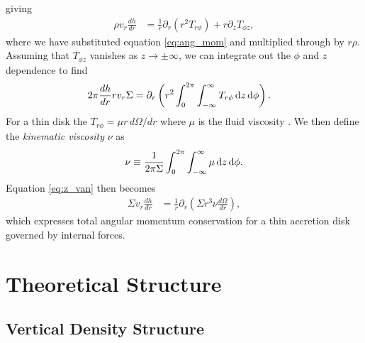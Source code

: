 giving
\begin{align}
    \rho v_r \frac{dh}{dr} &= \frac{1}{r} \partial_r (r^2 T_{r\phi}) + r \partial_z T_{\phi z},
\end{align}
where we have substituted equation \ref{eq:ang_mom} and multiplied through by $r \rho$.
Assuming that $T_{\phi z}$ vanishes as $z\rightarrow\pm\infty$, we can integrate out the $\phi$ and $z$ dependence to find
\begin{align}
    2\pi \frac{dh}{dr} r v_r \Sigma &= \partial_r \left( r^2 \int_0^{2\pi} \int_{-\infty}^\infty T_{r\phi} \mathop{}\!\mathrm{d}{z} \mathop{}\!\mathrm{d}{\phi} \right). \label{eq:z_van}
\end{align}
For a thin disk the $T_{r\phi}=\mu r \, d\Omega/dr$ where $\mu$ is the fluid viscosity \citep[see review by][]{papaloizou1995}.
We then define the \textit{kinematic viscosity} $\nu$ as
\begin{align}
    \nu \equiv \frac{1}{2 \pi \Sigma} \int_0^{2\pi} \int_{-\infty}^\infty \mu \mathop{}\!\mathrm{d}{z} \mathop{}\!\mathrm{d}{\phi}.
\end{align}
Equation \ref{eq:z_van} then becomes
\begin{align}
    \Sigma v_r \frac{dh}{dr} &= \frac{1}{r} \partial_r \left( \Sigma r^3 \nu \frac{d\Omega}{dr} \right), \label{eq:1d_angmom}
\end{align}
which expresses total angular momentum conservation for a thin accretion disk governed by internal forces.

\section{Theoretical Structure}

\subsection{Vertical Density Structure}

